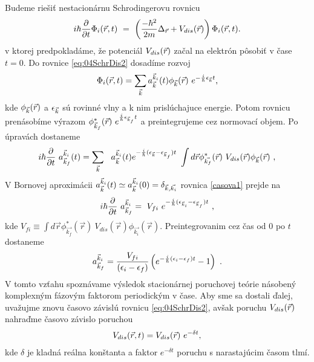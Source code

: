 Budeme riešiť nestacionárnu Schrodingerovu rovnicu
\begin{equation}
\label{eq:04SchrDis2}
i\hbar \frac{\partial}{\partial t}\Phi_{i}(\vec{r} ,t)
\ = \
\left(\frac{-\hbar^2}{2m}\Delta_{\vec{r}} + V_{dis}(\vec{r})\right)
\Phi_i(\vec{r} ,t)
  \text{.}
\end{equation}
v ktorej predpokladáme, že potenciál $V_{dis}(\vec{r})$ začal na elektrón pôsobiť v čase $t =0$. 
Do rovnice \eqref{eq:04SchrDis2} dosadíme rozvoj
\begin{equation}
\label{casovy rozvoj}
\Phi_i(\vec{r},t)=
\sum_{\vec{k}}a^{\vec{k}_i}_{\vec{k}}(t)\phi_{\vec{k}}(\vec{r})
\ e^{-\frac{i}{\hbar}\epsilon_{\vec{k}}t}\text{,}
\end{equation}
kde $\phi_{\vec{k}}(\vec{r})$ a $\epsilon_{\vec{k}}$ sú rovinné vlny a k nim prislúchajuce energie.
Potom rovnicu prenásobíme výrazom $ \phi^{\ast}_{\vec{k}_f}(\vec{r})
\ e^{\frac{i}{\hbar}\epsilon_{\vec{k}_f}t}$ a preintegrujeme
cez normovací objem. Po úpravách dostaneme
\begin{align}
\label{casova1}
i\hbar \frac{\partial}{\partial t}\ a^{\vk_i}_{\vk_f}(t)=\sum_{\vk}
\ \ a^{\vk_i}_{\vk}(t)e^{-\frac{i}{\hbar}(\epsilon_{\vk}-\epsilon_{\vk_f})t}
\ \int d\vec{r} \phi^{\ast}_{\vec{k_f}}(\vec{r})\ V_{dis}(\vec{r})
\phi_{\vec{k}}(\vec{r})
\ \text{,}
\end{align}
V Bornovej aproximácii
 $a^{\vec{k}_i}_{\vec{k}}(t) \simeq a^{\vec{k}_i}_{\vec{k}}(0) =\delta_{\vec{k},\vec{k_i}}$
 rovnica  \eqref{casova1}
prejde na
\begin{equation}
\label{casova2}
i\hbar \frac{\partial}{\partial t}\ a^{\vec{k}_i}_{\vec{k}_f}=
\ V_{fi}
\ e^{-\frac{i}{\hbar}(\epsilon_{\vec{k}_i}-\epsilon_{\vec{k}_f})t}
\ \text{,}
\end{equation}
kde $V_{fi}\equiv \int d\vec{r} \phi^{\ast}_{\vec{k_f}}(\vec{r})\ V_{dis}(\vec{r})
\phi_{\vec{k_i}}(\vec{r})$.
Preintegrovanim cez čas od $0$ po $t$ dostaneme
\begin{align}
\label{eq:04coef_nonstac}
a^{\vec{k}_i}_{\vec{k}_f}=\frac{V_{fi}}{(\epsilon_i-\epsilon_f)}
\left(
e^{-\frac{i}{\hbar}(\epsilon_i-\epsilon_f)t}-1
\right)
\ \text{.}
\end{align}
V tomto vzťahu spoznávame výsledok stacionárnej poruchovej teórie násobený komplexným fázovým faktorom periodickým v čase.
Aby sme sa dostali ďalej, uvažujme znovu časovo závislú rovnicu \eqref{eq:04SchrDis2}, avšak
poruchu $V_{dis}(\vec{r})$ nahraďme časovo závislo poruchou
\begin{align}
V_{dis}(\vec{r},t)=V_{dis}(\vec{r}) \ e^{-\delta t} \text{,}
\end{align}
kde $\delta$ je kladná reálna konštanta a faktor  $e^{-\delta t}$ poruchu s narastajúcim časom tlmí.
